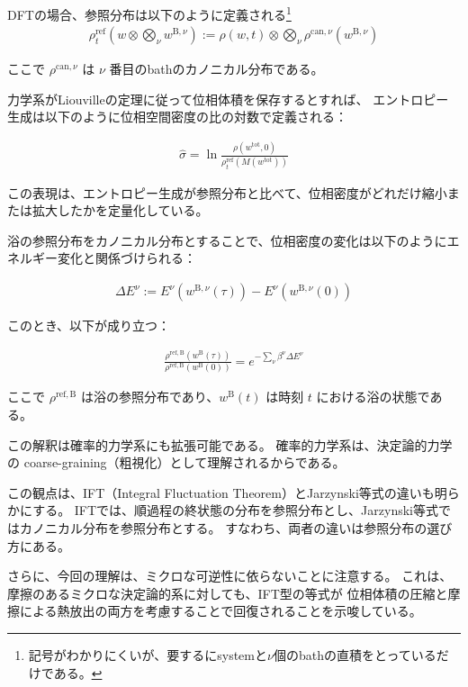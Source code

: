 \documentclass[a4paper,11pt]{jsarticle}
\numberwithin{equation}{section}
\begin{document}
DFTの場合、参照分布は以下のように定義される\footnote{記号がわかりにくいが、要するにsystemと$\nu$個のbathの直積をとっているだけである。}
\begin{align}
\rho_t^{\mathrm{ref}}\left(w \otimes \bigotimes_{\nu} w^{\mathrm{B}, \nu}\right)
:= \rho(w, t) \otimes \bigotimes_{\nu} \rho^{\mathrm{can}, \nu}(w^{\mathrm{B}, \nu})
\end{align}

ここで $\rho^{\mathrm{can}, \nu}$ は $\nu$ 番目のbathのカノニカル分布である。

力学系がLiouvilleの定理に従って位相体積を保存するとすれば、
エントロピー生成は以下のように位相空間密度の比の対数で定義される：

\begin{align}
\hat{\sigma} = \ln \frac{\rho(w^{\mathrm{tot}}, 0)}{\rho_t^{\mathrm{ref}}(M(w^{\mathrm{tot}}))}
\end{align}

この表現は、エントロピー生成が参照分布と比べて、位相密度がどれだけ縮小または拡大したかを定量化している。

\bigskip

浴の参照分布をカノニカル分布とすることで、位相密度の変化は以下のようにエネルギー変化と関係づけられる：

\begin{align}
\Delta E^{\nu} := E^{\nu}(w^{\mathrm{B}, \nu}(\tau)) - E^{\nu}(w^{\mathrm{B}, \nu}(0))
\end{align}

このとき、以下が成り立つ：

\begin{align}
\frac{\rho^{\mathrm{ref}, \mathrm{B}}(w^{\mathrm{B}}(\tau))}{\rho^{\mathrm{ref}, \mathrm{B}}(w^{\mathrm{B}}(0))}
= e^{-\sum_{\nu} \beta^{\nu} \Delta E^{\nu}}
\end{align}

ここで $\rho^{\mathrm{ref}, \mathrm{B}}$ は浴の参照分布であり、$w^{\mathrm{B}}(t)$ は時刻 $t$ における浴の状態である。

この解釈は確率的力学系にも拡張可能である。
確率的力学系は、決定論的力学の coarse-graining（粗視化）として理解されるからである。

\bigskip

この観点は、IFT（Integral Fluctuation Theorem）とJarzynski等式の違いも明らかにする。
IFTでは、順過程の終状態の分布を参照分布とし、Jarzynski等式ではカノニカル分布を参照分布とする。
すなわち、両者の違いは参照分布の選び方にある。

さらに、今回の理解は、ミクロな可逆性に依らないことに注意する。
これは、摩擦のあるミクロな決定論的系に対しても、IFT型の等式が
位相体積の圧縮と摩擦による熱放出の両方を考慮することで回復されることを示唆している。
\end{document}
